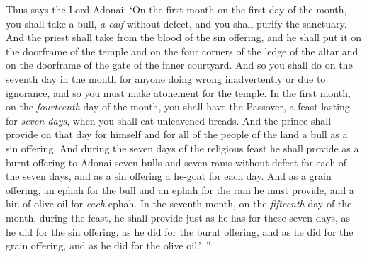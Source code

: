 \begin{biblechapter}
\verse Thus says the Lord Adonai: ‘On the first month on the first day of the month, you shall take a bull, \textit{a calf} without defect, and you shall purify the sanctuary.
\verse And the priest shall take from the blood of the sin offering, and he shall put it on the doorframe of the temple and on the four corners of the ledge of the altar and on the doorframe of the gate of the inner courtyard.
\verse And so you shall do on the seventh day in the month for anyone doing wrong inadvertently or due to ignorance, and so you must make atonement for the temple.
\verse In the first month, on the \textit{fourteenth} day of the month, you shall have the Passover, a feast lasting for \textit{seven days}, when you shall eat unleavened breads.
\verse And the prince shall provide on that day for himself and for all of the people of the land a bull as a sin offering.
\verse And during the seven days of the religious feast he shall provide as a burnt offering to Adonai seven bulls and seven rams without defect for each of the seven days, and as a sin offering a he-goat for each day.
\verse And as a grain offering, an ephah for the bull and an ephah for the ram he must provide, and a hin of olive oil for \textit{each} ephah.
\verse In the seventh month, on the \textit{fifteenth} day of the month, during the feast, he shall provide just as he has for these seven days, as he did for the sin offering, as he did for the burnt offering, and as he did for the grain offering, and as he did for the olive oil.’ ”
\end{biblechapter}

